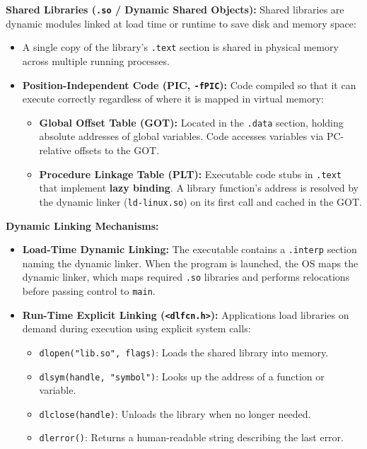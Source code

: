 \begin{definition}
    \textbf{Shared Libraries (\texttt{.so} / Dynamic Shared Objects):}
    Shared libraries are dynamic modules linked at load time or runtime to save disk and memory space:
    \begin{itemize}
        \item A single copy of the library's \texttt{.text} section is shared in physical memory across multiple running processes.
        \item \textbf{Position-Independent Code (PIC, \texttt{-fPIC}):} Code compiled so that it can execute correctly regardless of where it is mapped in virtual memory:
        \begin{itemize}
            \item \textbf{Global Offset Table (GOT):} Located in the \texttt{.data} section, holding absolute addresses of global variables. Code accesses variables via PC-relative offsets to the GOT.
            \item \textbf{Procedure Linkage Table (PLT):} Executable code stubs in \texttt{.text} that implement \textbf{lazy binding}. A library function's address is resolved by the dynamic linker (\texttt{ld-linux.so}) on its first call and cached in the GOT.
        \end{itemize}
    \end{itemize}
\end{definition}

\begin{definition}
    \textbf{Dynamic Linking Mechanisms:}
    \begin{itemize}
        \item \textbf{Load-Time Dynamic Linking:} The executable contains a \texttt{.interp} section naming the dynamic linker. When the program is launched, the OS maps the dynamic linker, which maps required \texttt{.so} libraries and performs relocations before passing control to \texttt{main}.
        \item \textbf{Run-Time Explicit Linking (\texttt{<dlfcn.h>}):} Applications load libraries on demand during execution using explicit system calls:
        \begin{itemize}
            \item \texttt{dlopen("lib.so", flags)}: Loads the shared library into memory.
            \item \texttt{dlsym(handle, "symbol")}: Looks up the address of a function or variable.
            \item \texttt{dlclose(handle)}: Unloads the library when no longer needed.
            \item \texttt{dlerror()}: Returns a human-readable string describing the last error.
        \end{itemize}
    \end{itemize}
\end{definition}

